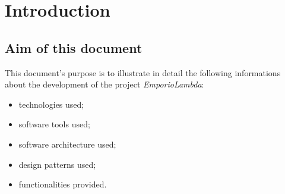 \section{Introduction}
\subsection{Aim of this document}
This document's purpose is to illustrate in detail the following informations about the development of the project \textit{EmporioLambda}:
\begin{itemize}
\item technologies used;
\item software tools used;
\item software architecture used;
\item design patterns used;
\item functionalities provided.
\end{itemize}
